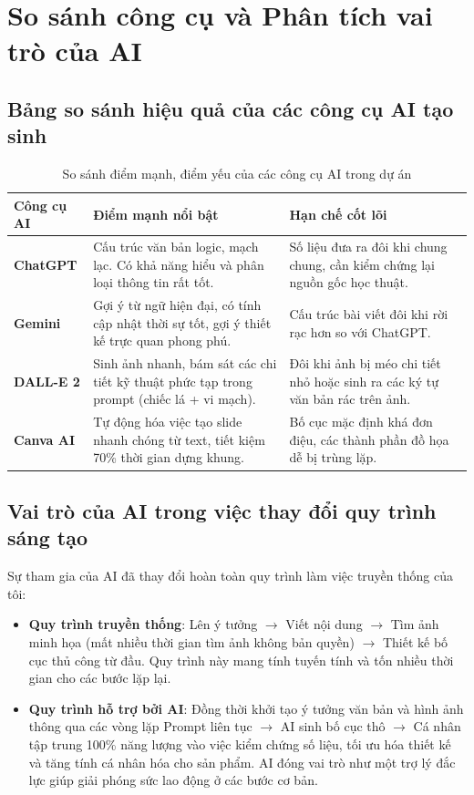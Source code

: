 \documentclass[12pt,a4paper]{article}
\begin{document}
\newpage
\section{So sánh công cụ và Phân tích vai trò của AI}

\subsection{Bảng so sánh hiệu quả của các công cụ AI tạo sinh}
\begin{table}[H]
    \centering
    \caption{So sánh điểm mạnh, điểm yếu của các công cụ AI trong dự án}
    \vspace{0.2cm}
    \small
    \begin{tabular}{|p{2.5cm}|p{6.0cm}|p{6.0cm}|}
        \hline
        \textbf{Công cụ AI} & \textbf{Điểm mạnh nổi bật} & \textbf{Hạn chế cốt lõi} \\
        \hline
        \textbf{ChatGPT} & Cấu trúc văn bản logic, mạch lạc. Có khả năng hiểu và phân loại thông tin rất tốt. & Số liệu đưa ra đôi khi chung chung, cần kiểm chứng lại nguồn gốc học thuật. \\
        \hline
        \textbf{Gemini} & Gợi ý từ ngữ hiện đại, có tính cập nhật thời sự tốt, gợi ý thiết kế trực quan phong phú. & Cấu trúc bài viết đôi khi rời rạc hơn so với ChatGPT. \\
        \hline
        \textbf{DALL-E 2} & Sinh ảnh nhanh, bám sát các chi tiết kỹ thuật phức tạp trong prompt (chiếc lá + vi mạch). & Đôi khi ảnh bị méo chi tiết nhỏ hoặc sinh ra các ký tự văn bản rác trên ảnh. \\
        \hline
        \textbf{Canva AI} & Tự động hóa việc tạo slide nhanh chóng từ text, tiết kiệm 70\% thời gian dựng khung. & Bố cục mặc định khá đơn điệu, các thành phần đồ họa dễ bị trùng lặp. \\
        \hline
    \end{tabular}
    \label{tab:ai_comparison}
\end{table}

\subsection{Vai trò của AI trong việc thay đổi quy trình sáng tạo}
Sự tham gia của AI đã thay đổi hoàn toàn quy trình làm việc truyền thống của tôi:
\begin{itemize}
    \item \textbf{Quy trình truyền thống}: Lên ý tưởng $\rightarrow$ Viết nội dung $\rightarrow$ Tìm ảnh minh họa (mất nhiều thời gian tìm ảnh không bản quyền) $\rightarrow$ Thiết kế bố cục thủ công từ đầu. Quy trình này mang tính tuyến tính và tốn nhiều thời gian cho các bước lặp lại.
    \item \textbf{Quy trình hỗ trợ bởi AI}: Đồng thời khởi tạo ý tưởng văn bản và hình ảnh thông qua các vòng lặp Prompt liên tục $\rightarrow$ AI sinh bố cục thô $\rightarrow$ Cá nhân tập trung 100\% năng lượng vào việc kiểm chứng số liệu, tối ưu hóa thiết kế và tăng tính cá nhân hóa cho sản phẩm. AI đóng vai trò như một trợ lý đắc lực giúp giải phóng sức lao động ở các bước cơ bản.
\end{itemize}
\end{document}
